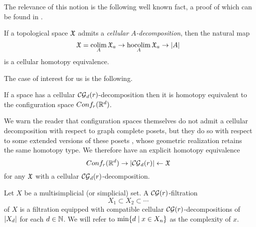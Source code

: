 The relevance of this notion is the following well known fact, a proof of which can be found in \cite[\S1.7]{berger1997confspacemodel}.

\begin{proposition}
	If a topological space $\mathfrak{X}$ admits a \textit{cellular $A$-decomposition}, then the natural map
	\[
	\mathfrak{X} = \operatorname*{colim}_A \mathfrak{X}_a \to \operatorname*{hocolim}_A \mathfrak{X}_a \to \lvert A\rvert
	\]
	is a cellular homotopy equivalence.
\end{proposition}

The case of interest for us is the following.

\begin{proposition}\label{p:berger}
	If a space has a cellular $\mathcal{CG}_d(r)$-decomposition then it is homotopy equivalent to
	the configuration space $Conf_{r}(\mathbb{R}^{d})$.
\end{proposition}

We warn the reader that configuration spaces themselves do not admit a cellular decomposition with respect to graph complete posets, but they do so with respect to some extended versions of these posets \cite{beuckelmann2021master}, whose geometric realization retains the same homotopy type.
We therefore have an explicit homotopy equivalence
\begin{equation}\label{eq:extended complete graph map}
	Conf_{r}(\mathbb{R}^{d}) \to \lvert\mathcal{CG}_d(r)\rvert \leftarrow \mathfrak{X}
\end{equation}
for any $\mathfrak{X}$ with a cellular $\mathcal{CG}_d(r)$-decomposition.

\begin{definition}
	Let $X$ be a multisimplicial (or simplicial) set.
	A $\mathcal{CG}(r)$-filtration
	\[
	X_1 \subset X_2 \subset \dotsb
	\]
	of $X$ is a filtration equipped with compatible cellular $\mathcal{CG}(r)$-decompositions of $\lvert X_d\rvert$ for each $d \in \mathbb{N}$.
	We will refer to $\min\{d \mid x \in X_n\}$ as the complexity of $x$.
\end{definition}
